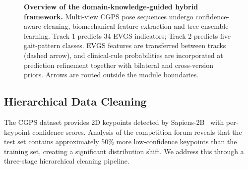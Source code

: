 \begin{figure}[t]
{%
}
\caption{\textbf{Overview of the domain-knowledge-guided hybrid framework.}
Multi-view CGPS pose sequences undergo confidence-aware cleaning, biomechanical feature extraction and tree-ensemble learning. Track 1 predicts 34 EVGS indicators; Track 2 predicts five gait-pattern classes. EVGS features are transferred between tracks (dashed arrow), and clinical-rule probabilities are incorporated at prediction refinement together with bilateral and cross-version priors. Arrows are routed outside the module boundaries.}
\label{fig:pipeline}
\end{figure}

\subsection{Hierarchical Data Cleaning}
\label{sec:cleaning}

The CGPS dataset provides 2D keypoints detected by Sapiens-2B~\cite{khirodkar2024sapiens} with per-keypoint confidence scores. Analysis of the competition forum reveals that the test set contains approximately 50\% more low-confidence keypoints than the training set, creating a significant distribution shift. We address this through a three-stage hierarchical cleaning pipeline.

